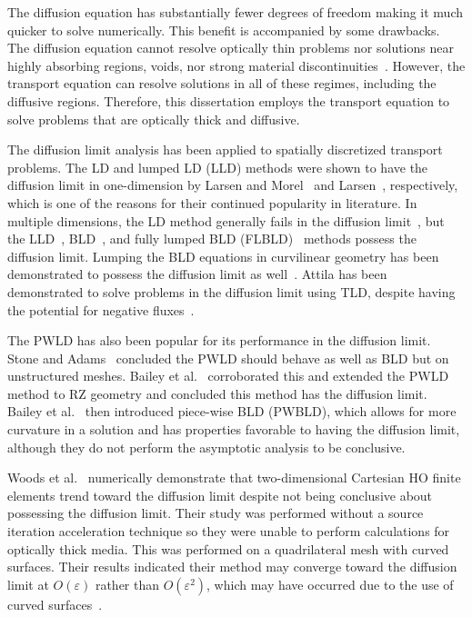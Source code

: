 \documentclass{article}
\begin{document}
The diffusion equation has substantially fewer degrees of freedom making it much quicker to solve numerically. This benefit is accompanied by some drawbacks. The diffusion equation cannot resolve optically thin problems nor solutions near highly absorbing regions, voids, nor strong material discontinuities~\cite{D&H}. However, the transport equation can resolve solutions in all of these regimes, including the diffusive regions. Therefore, this dissertation employs the transport equation to solve problems that are optically thick and diffusive.

The diffusion limit analysis has been applied to spatially discretized transport problems. The LD and lumped LD (LLD) methods were shown to have the diffusion limit in one-dimension by Larsen and Morel~\cite{LarsenAsymptotic} and Larsen~\cite{LarsenAsymptoticDiffusionLimit}, respectively, which is one of the reasons for their continued popularity in literature. In multiple dimensions, the LD method generally fails in the diffusion limit~\cite{BorgersAsymptoticDiffLimit}, but the LLD~\cite{MorelLLDrz, MorelLLDTetrahedral}, BLD~\cite{Adams_Disc_FEM_Thick_Diff}, and fully lumped BLD (FLBLD)~\cite{AdamsDFEMDiffLimit} methods possess the diffusion limit. Lumping the BLD equations in curvilinear geometry has been demonstrated to possess the diffusion limit as well~\cite{PalmerCurvilinearTransport, MorelLBLD}. Attila has been demonstrated to solve problems in the diffusion limit using TLD, despite having the potential for negative fluxes~\cite{AttilaUsersManual}.

The PWLD has also been popular for its performance in the diffusion limit. Stone and Adams~\cite{StonePLFEM} concluded the PWLD should behave as well as BLD but on unstructured meshes. Bailey et al.~\cite{BaileyDFEMCylindrical, BaileyDissertation} corroborated this and extended the PWLD method to RZ geometry and concluded this method has the diffusion limit. Bailey et al.~\cite{BaileyBLDFEM} then introduced piece-wise BLD (PWBLD), which allows for more curvature in a solution and has properties favorable to having the diffusion limit, although they do not perform the asymptotic analysis to be conclusive.

Woods et al.~\cite{WoodsHoDgfemXyCurved} numerically demonstrate that two-dimensional Cartesian HO finite elements trend toward the diffusion limit despite not being conclusive about possessing the diffusion limit. Their study was performed without a source iteration acceleration technique so they were unable to perform calculations for optically thick media. This was performed on a quadrilateral mesh with curved surfaces. Their results indicated their method may converge toward the diffusion limit at $O(\varepsilon)$ rather than $O(\varepsilon^2)$, which may have occurred due to the use of curved surfaces~\cite{Adams_Disc_FEM_Thick_Diff}.
\end{document}
